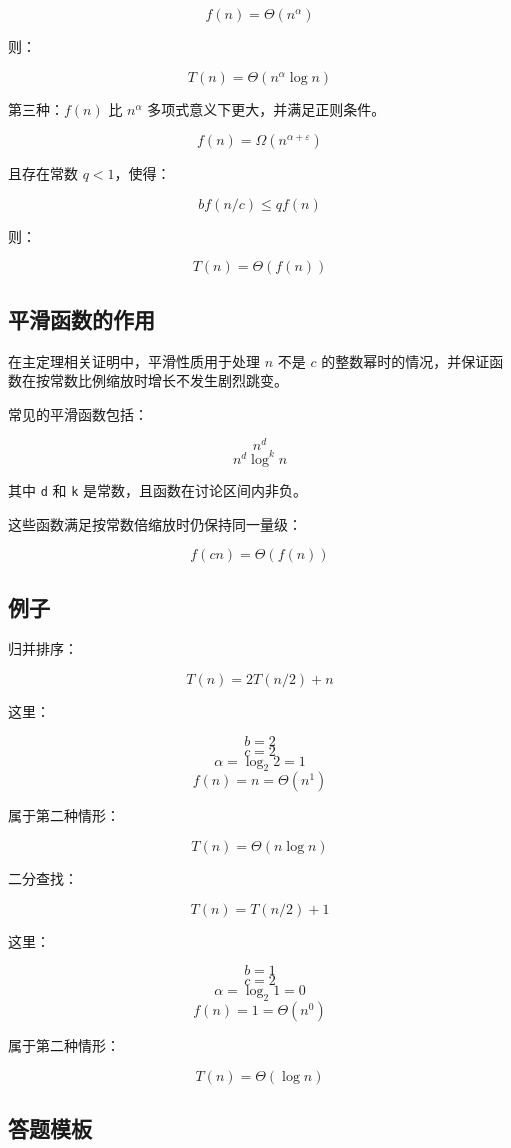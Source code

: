 \documentclass[UTF8,zihao=-4]{ctexart}
\begin{document}
\[f(n) = \Theta(n^\alpha)\]

则：

\[T(n) = \Theta(n^\alpha \log n)\]

第三种：$f(n)$ 比 $n^\alpha$ 多项式意义下更大，并满足正则条件。

\[f(n) = \Omega(n^{\alpha + \varepsilon})\]

且存在常数 $q < 1$，使得：

\[b f(n/c) \le  q f(n)\]

则：

\[T(n) = \Theta(f(n))\]

\subsection*{平滑函数的作用}

在主定理相关证明中，平滑性质用于处理 $n$ 不是 $c$ 的整数幂时的情况，并保证函数在按常数比例缩放时增长不发生剧烈跳变。

常见的平滑函数包括：

\[n^{d}\]
\[n^{d} \log^{k} n\]

其中 \texttt{d} 和 \texttt{k} 是常数，且函数在讨论区间内非负。

这些函数满足按常数倍缩放时仍保持同一量级：

\[f(cn) = \Theta(f(n))\]

\subsection*{例子}

归并排序：

\[T(n) = 2T(n/2) + n\]

这里：

\[b = 2\]
\[c = 2\]
\[\alpha = \log_2 2 = 1\]
\[f(n) = n = \Theta(n^{1})\]

属于第二种情形：

\[T(n) = \Theta(n \log n)\]

二分查找：

\[T(n) = T(n/2) + 1\]

这里：

\[b = 1\]
\[c = 2\]
\[\alpha = \log_2 1 = 0\]
\[f(n) = 1 = \Theta(n^{0})\]

属于第二种情形：

\[T(n) = \Theta(\log n)\]

\subsection*{答题模板}
\end{document}
